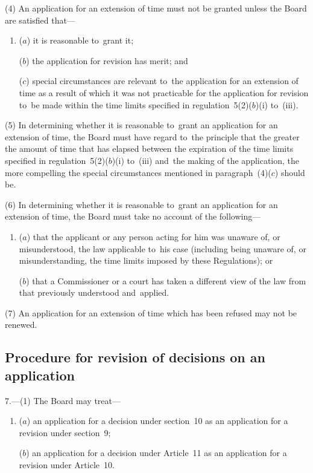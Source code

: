 \documentclass[12pt,a4paper]{article}
\begin{document}
(4) An application for an extension of time must not be granted unless the Board are satisfied that—
\begin{enumerate}\item[]
($a$) it is reasonable to~grant it;

($b$) the application for revision has merit; and

($c$) special circumstances are relevant to~the application for an extension of time as a result of which it was not practicable for the application for revision to~be made within the time limits specified in regulation~5(2)($b$)(i)  to~(iii).
\end{enumerate}

(5) In determining whether it is reasonable to~grant an application for an extension of time, the Board must have regard to~the principle that the greater the amount of time that has elapsed between the expiration of the time limits specified in regulation~5(2)($b$)(i)  to~(iii)  and~the making of the application, the more compelling the special circumstances mentioned in paragraph~(4)($c$)  should be.

(6) In determining whether it is reasonable to~grant an application for an extension of time, the Board must take no account of the following—
\begin{enumerate}\item[]
($a$) that the applicant or any person acting for him was unaware of, or misunderstood, the law applicable to~his case (including being unaware of, or misunderstanding, the time limits imposed by these Regulations); or

($b$) that a Commissioner or a court has taken a different view of the law from that previously understood and~applied.
\end{enumerate}

(7) An application for an extension of time which has been refused may not be renewed.

\subsection[7. Procedure for revision of decisions on an application]{Procedure for revision of decisions on an application}

7.---(1)  The Board may treat—
\begin{enumerate}\item[]
($a$) an application for a decision under section~10 as an application for a revision under section~9;

($b$) an application for a decision under Article~11 as an application for a revision under Article~10.
\end{enumerate}
\end{document}
